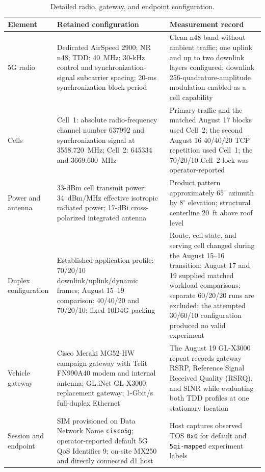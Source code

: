 \begin{table}[t]
  \caption{Detailed radio, gateway, and endpoint configuration.}
  \label{tab:radio-details}
  \centering
  \scriptsize
  \setlength{\tabcolsep}{2.7pt}
  \begin{tabular}{@{}p{}p{}p{}@{}}
    \toprule
    Element & Retained configuration & Measurement record \\
    \midrule
    5G radio & Dedicated AirSpeed 2900; NR n48; TDD; 40~MHz; 30-kHz control and synchronization-signal subcarrier spacing; 20-ms synchronization block period & Clean n48 band without ambient traffic; one uplink and up to two downlink layers configured; downlink 256-quadrature-amplitude modulation enabled as a cell capability \\
    Cells & Cell~1: absolute radio-frequency channel number 637992 and synchronization signal at 3558.720~MHz; Cell~2: 645334 and 3669.600~MHz & Primary traffic and the matched August 17 blocks used Cell~2; the second August 16 40/40/20 TCP repetition used Cell~1; the 70/20/10 Cell~2 lock was operator-reported \\
    Power and antenna & 33-dBm cell transmit power; 34~dBm/MHz effective isotropic radiated power; 17-dBi cross-polarized integrated antenna & Product pattern approximately $65^{\circ}$ azimuth by $8^{\circ}$ elevation; structural centerline 20~ft above roof level \\
    Duplex configuration & Established application profile: 70/20/10 downlink/uplink/dynamic frames; August 15--19 comparison: 40/40/20 and 70/20/10; fixed 10D4G packing & Route, cell state, and serving cell changed during the August 15--16 transition; August 17 and 19 supplied matched workload comparisons; separate 60/20/20 runs are excluded; the attempted 30/60/10 configuration produced no valid experiment \\
    Vehicle gateway & Cisco Meraki MG52-HW campaign gateway with Telit FN990A40 modem and internal antenna; GL.iNet GL-X3000 replacement gateway; 1-Gbit/s full-duplex Ethernet & The August 19 GL-X3000 repeat records gateway RSRP, Reference Signal Received Quality (RSRQ), and SINR while evaluating both TDD profiles at one stationary location \\
    Session and endpoint & SIM provisioned on Data Network Name \texttt{cisco5g}; operator-reported default 5G QoS Identifier 9; on-site MX250 and directly connected d1 host & Host captures observed TOS \texttt{0x0} for default and \texttt{5qi-mapped} experiment labels \\

\end{tabular}
\end{table}
